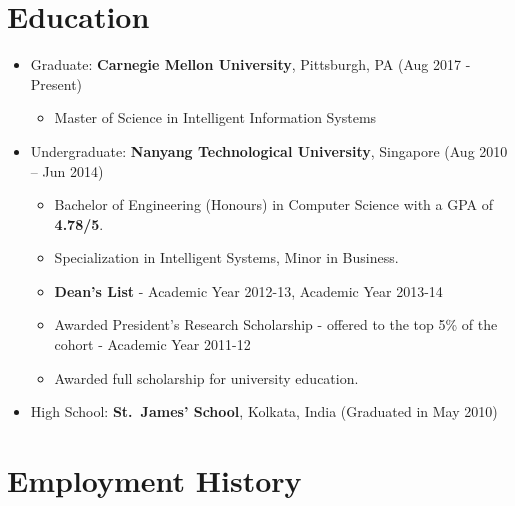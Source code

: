 
\section{Education}\label{education}

\begin{itemize}
\tightlist
\item
  Graduate: \textbf{Carnegie Mellon University}, Pittsburgh, PA
  \hfill (Aug 2017 - Present)

  \begin{itemize}
  \tightlist
  \item
    Master of Science in Intelligent Information Systems
  \end{itemize}
\item
  Undergraduate: \textbf{Nanyang Technological University}, Singapore
  \hfill (Aug 2010 -- Jun 2014)

  \begin{itemize}
  \tightlist
  \item
    Bachelor of Engineering (Honours) in Computer Science with a GPA of
    \textbf{4.78/5}.
  \item
    Specialization in Intelligent Systems, Minor in Business.
  \item
    \textbf{Dean's List} - Academic Year 2012-13, Academic Year 2013-14
  \item
    Awarded President's Research Scholarship - offered to the top 5\% of
    the cohort - Academic Year 2011-12
  \item
    Awarded full scholarship for university education.
  \end{itemize}
\item
  High School: \textbf{St.~James' School}, Kolkata, India
  \hfill (Graduated in May 2010)
\end{itemize}

\section{Employment History}\label{employment-history}

